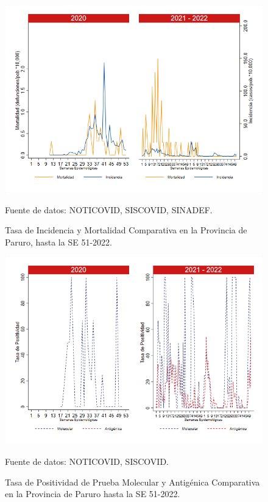 \documentclass[12pt,a4paper,openany]{book}
\begin{document}
	\begin{figure}[h]
		\caption{Tasa de Incidencia y Mortalidad Comparativa en la Provincia de Paruro, hasta la SE 51-2022.}\label{fig:inc_mort_paruro}
		\begin{center}
			\includegraphics[width=0.85\linewidth]{../figuras/incidencia_mortalidad_20_21_10.png}
		\end{center}
		{\footnotesize {Fuente de datos: NOTICOVID, SISCOVID, SINADEF.}} 
	\end{figure}
	
	\begin{figure}[h]
		\caption{Tasa de Positividad de Prueba Molecular y Antigénica Comparativa en la Provincia de Paruro hasta la SE 51-2022.}\label{fig:positividad_paruro}
		\begin{center}
			\includegraphics[width=0.7\linewidth]{../figuras/positividad_20_21_10.png}
		\end{center}
		{\footnotesize {Fuente de datos: NOTICOVID, SISCOVID.}}
	\end{figure}
	
\end{document}
